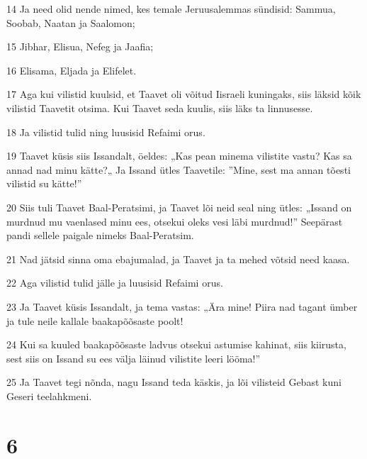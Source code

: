 \par 14 Ja need olid nende nimed, kes temale Jeruusalemmas sündisid: Sammua, Soobab, Naatan ja Saalomon;
\par 15 Jibhar, Elisua, Nefeg ja Jaafia;
\par 16 Elisama, Eljada ja Elifelet.
\par 17 Aga kui vilistid kuulsid, et Taavet oli võitud Iisraeli kuningaks, siis läksid kõik vilistid Taavetit otsima. Kui Taavet seda kuulis, siis läks ta linnusesse.
\par 18 Ja vilistid tulid ning luusisid Refaimi orus.
\par 19 Taavet küsis siis Issandalt, öeldes: „Kas pean minema vilistite vastu? Kas sa annad nad minu kätte?„ Ja Issand ütles Taavetile: ”Mine, sest ma annan tõesti vilistid su kätte!”
\par 20 Siis tuli Taavet Baal-Peratsimi, ja Taavet lõi neid seal ning ütles: „Issand on murdnud mu vaenlased minu ees, otsekui oleks vesi läbi murdnud!” Seepärast pandi sellele paigale nimeks Baal-Peratsim.
\par 21 Nad jätsid sinna oma ebajumalad, ja Taavet ja ta mehed võtsid need kaasa.
\par 22 Aga vilistid tulid jälle ja luusisid Refaimi orus.
\par 23 Ja Taavet küsis Issandalt, ja tema vastas: „Ära mine! Piira nad tagant ümber ja tule neile kallale baakapõõsaste poolt!
\par 24 Kui sa kuuled baakapõõsaste ladvus otsekui astumise kahinat, siis kiirusta, sest siis on Issand su ees välja läinud vilistite leeri lööma!”
\par 25 Ja Taavet tegi nõnda, nagu Issand teda käskis, ja lõi vilisteid Gebast kuni Geseri teelahkmeni.

\chapter{6}

